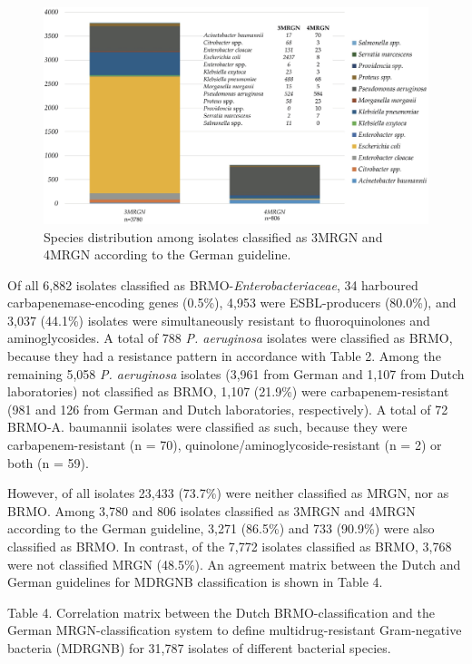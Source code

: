 \documentclass[
]{book}
\begin{document}
\begin{figure}

{\centering \includegraphics[width=1\linewidth]{images/08-01} 

}

\caption{Species distribution among isolates classified as 3MRGN and 4MRGN according to the German guideline.}\label{fig:fig8-1}
\end{figure}

Of all 6,882 isolates classified as BRMO-\emph{Enterobacteriaceae}, 34 harboured carbapenemase-encoding genes (0.5\%), 4,953 were ESBL-producers (80.0\%), and 3,037 (44.1\%) isolates were simultaneously resistant to fluoroquinolones and aminoglycosides. A total of 788 \emph{P. aeruginosa} isolates were classified as BRMO, because they had a resistance pattern in accordance with Table 2. Among the remaining 5,058 \emph{P. aeruginosa} isolates (3,961 from German and 1,107 from Dutch laboratories) not classified as BRMO, 1,107 (21.9\%) were carbapenem-resistant (981 and 126 from German and Dutch laboratories, respectively). A total of 72 BRMO-A. baumannii isolates were classified as such, because they were carbapenem-resistant (n = 70), quinolone/aminoglycoside-resistant (n = 2) or both (n = 59).

However, of all isolates 23,433 (73.7\%) were neither classified as MRGN, nor as BRMO. Among 3,780 and 806 isolates classified as 3MRGN and 4MRGN according to the German guideline, 3,271 (86.5\%) and 733 (90.9\%) were also classified as BRMO. In contrast, of the 7,772 isolates classified as BRMO, 3,768 were not classified MRGN (48.5\%). An agreement matrix between the Dutch and German guidelines for MDRGNB classification is shown in Table 4.

Table 4. Correlation matrix between the Dutch BRMO-classification and the German MRGN-classification system to define multidrug-resistant Gram-negative bacteria (MDRGNB) for 31,787 isolates of different bacterial species.
\end{document}

